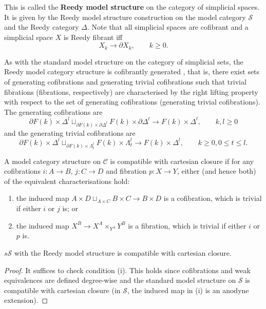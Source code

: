 \begin{refsection}
This is called the \textbf{Reedy model structure} on the category of simplicial spaces. It is given by the Reedy model structure construction on the model category $\mathcal S$ and the Reedy category $\Delta$. Note that all simplicial spaces are cofibrant and a simplicial space $X$ is Reedy fibrant iff
$$X_k\to\partial X_k,\qquad k\ge 0.$$

As with the standard model structure on the category of simplicial sets, the Reedy model category structure is cofibrantly generated \cite{dhk}, that is, there exist sets of generating cofibrations and generating trivial cofibrations such that trivial fibrations (fibrations, respectively) are characterised by the right lifting property with respect to the set of generating cofibrations (generating trivial cofibrations). The generating cofibrations are
$$\partial F(k)\times \Delta^l\sqcup_{\partial F(k)\times\partial\Delta^l}F(k)\times\partial\Delta^l\to F(k)\times\Delta^l,\qquad k,l\ge0$$
and the generating trivial cofibrations are
$$\partial F(k)\times \Delta^l\sqcup_{\partial F(k)\times\Lambda^l_t}F(k)\times\Lambda^l_t\to F(k)\times\Delta^l,\qquad k\ge0,0\le t\le l.$$

\begin{defin}
  A model category structure on $\mathcal{C}$ is compatible with cartesian closure if for any cofibrations $i:A\to B$, $j:C\to D$ and fibration $p:X\to Y$, either (and hence both) of the equivalent characterisations hold:
\begin{enumerate}
\item the induced map $A\times D\sqcup_{A\times C}B\times C\to B\times D$ is a cofibration, which is trivial if either $i$ or $j$ is; or
\item the induced map $X^B\to X^A\times_{Y^A}Y^B$ is a fibration, which is trivial if either $i$ or $p$ is.
\end{enumerate}
\end{defin}

\begin{prop}
$s\mathcal S$ with the Reedy model structure is compatible with cartesian closure.
\end{prop}
\begin{proof}
It suffices to check condition (i). This holds since cofibrations and weak equivalences are defined degree-wise and the standard model structure on $\mathcal S$ is compatible with cartesian closure (in $\mathcal S$, the induced map in (i) is an anodyne extension).
\end{proof}


\end{refsection}
